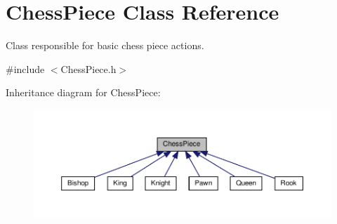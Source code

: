 \hypertarget{classChessPiece}{}\section{Chess\+Piece Class Reference}
\label{classChessPiece}


Class responsible for basic chess piece actions.  




{\ttfamily \#include $<$Chess\+Piece.\+h$>$}



Inheritance diagram for Chess\+Piece\+:\nopagebreak
\begin{figure}[H]
\begin{center}
\leavevmode
\includegraphics[width=350pt]{classChessPiece__inherit__graph}
\end{center}
\end{figure}

